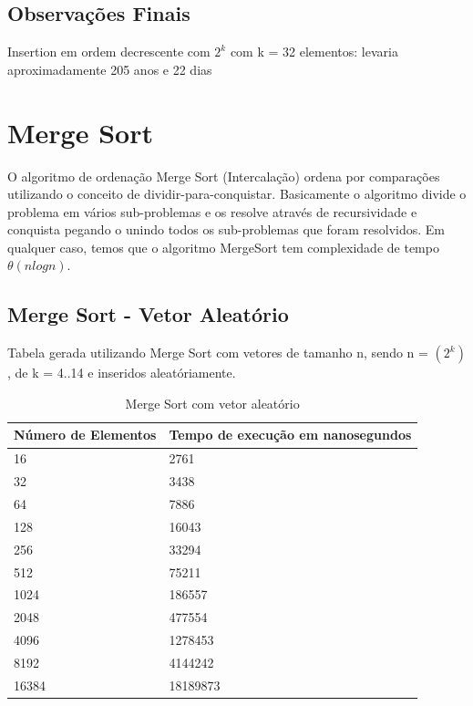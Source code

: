 \documentclass[12pt,a4paper,twoside]{report}
\begin{document}
\section{Observações Finais}
Insertion em ordem decrescente com $2^k$ com k = 32 elementos: levaria aproximadamente 205 anos e 22 dias 

\chapter{Merge Sort}
O algoritmo de ordenação Merge Sort (Intercalação) ordena por comparações utilizando o conceito de dividir-para-conquistar.
Basicamente o algoritmo divide o problema em vários sub-problemas e os resolve através de recursividade e conquista pegando o unindo todos os sub-problemas que foram resolvidos.
Em qualquer caso, temos que o algoritmo MergeSort tem complexidade de tempo $\theta(nlogn)$.

\section{Merge Sort - Vetor Aleatório}
Tabela gerada utilizando Merge Sort com vetores de tamanho n, sendo n = $(2^k)$, de k = 4..14 e inseridos aleatóriamente.
\begin{table}[H]
\centering
\caption{Merge Sort com vetor aleatório}
\label{my-label}
\begin{tabular}{|l|l|}
\hline
\multicolumn{1}{|c|}{\textbf{Número de Elementos}} & \multicolumn{1}{c|}{\textbf{Tempo de execução em nanosegundos}} \\ \hline
16 & 2761 \\ \hline
32 & 3438 \\ \hline
64 & 7886 \\ \hline
128 & 16043 \\ \hline
256 & 33294 \\ \hline
512 & 75211 \\ \hline
1024 & 186557 \\ \hline
2048 & 477554 \\ \hline
4096 & 1278453 \\ \hline
8192 & 4144242 \\ \hline
16384 & 18189873 \\ \hline
\end{tabular}
\end{table}
\end{document}
